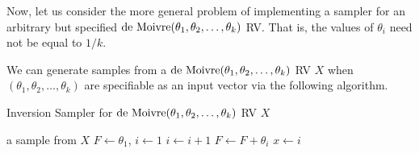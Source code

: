 Now, let us consider the more general problem of implementing a sampler for an arbitrary but specified $\mbox{{\rm de~Moivre}}(\theta_1,\theta_2,\ldots,\theta_k)$ RV.  That is, the values of $\theta_i$ need not be equal to $1/k$.
\begin{simulation}\label{SIM:deMoivre}
We can generate samples from a $\mbox{{\rm de~Moivre}}(\theta_1,\theta_2,\ldots,\theta_k)$ RV $X$ when $(\theta_1,\theta_2,\ldots,\theta_k)$ are specifiable as an input vector via the following algorithm.

\begin{algorithm}
\caption{Inversion Sampler for $\mbox{{\rm de~Moivre}}(\theta_1,\theta_2,\ldots,\theta_k)$ RV $X$}
\label{A:SimdeMoivre}
\begin{algorithmic}[1]
 a sample from $X$
  $F \gets \theta_1$, $i \gets 1$
\STATE $i \gets i+1$
\STATE $F \gets F+\theta_{i}$
\ENDWHILE
{} $x \gets i$
\end{algorithmic}
\end{algorithm}


\end{simulation}
